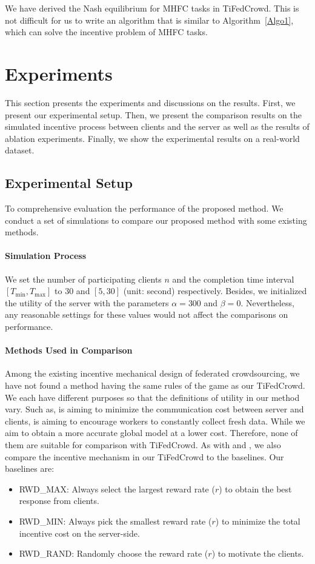 \documentclass[final,1p,times]{elsarticle}
\begin{document}
We have derived the Nash equilibrium for MHFC tasks in TiFedCrowd. This is not difficult for us to write an algorithm that is similar to Algorithm~\ref{Algo1}, which can solve the incentive problem of MHFC tasks.

\section{Experiments} \label{sec:exp}
This section presents the experiments and discussions on the results. First, we present our experimental setup. Then, we present the comparison results on the simulated incentive process between clients and the server as well as the results of ablation experiments. Finally, we show the experimental results on a real-world dataset.

\subsection{Experimental Setup}
To comprehensive evaluation the performance of the proposed method. We conduct a set of simulations to compare our proposed method with some existing methods.
\paragraph{\textbf{Simulation Process}}
We set the number of participating clients $n$ and the completion time interval $[T_{\min},T_{\max}]$ to $30$ and $[5,30]$ (unit: second) respectively. Besides, we initialized the utility of the server with the parameters $\alpha=300$ and $\beta=0$. Nevertheless, any reasonable settings for these values would not affect the comparisons on performance. 
\paragraph{\textbf{Methods Used in Comparison}}
Among the existing incentive mechanical design of federated crowdsourcing, we have not found a method having the same rules of the game as our TiFedCrowd. We each have different purposes so that the definitions of utility in our method vary. Such as, \cite{pandey2019incentivize} is aiming to minimize the communication cost between server and clients, \cite{kang2022incentive} is aiming to encourage workers to constantly collect fresh data. While we aim to obtain a more accurate global model at a lower cost. Therefore, none of them are suitable for comparison with TiFedCrowd. As with \cite{pandey2019incentivize} and \cite{kang2022incentive}, we also compare the incentive mechanism in our TiFedCrowd to the baselines. Our baselines are:
\begin{itemize}
	\item RWD\_MAX: Always select the largest reward rate ($r$) to obtain the best response from clients.  
	\item RWD\_MIN: Always pick the smallest reward rate ($r$) to minimize the total incentive cost on the server-side.
	\item RWD\_RAND: Randomly choose the reward rate ($r$) to motivate the clients.
\end{itemize}
\end{document}
